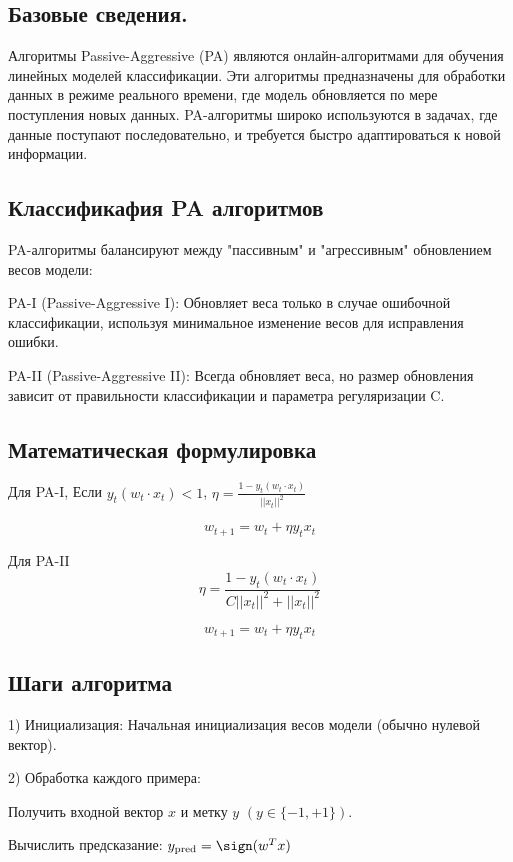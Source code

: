 \begin{itemize}
\subsection*{Базовые сведения.}

Алгоритмы Passive-Aggressive (PA) являются онлайн-алгоритмами для обучения линейных моделей классификации.
Эти алгоритмы предназначены для обработки данных в режиме реального времени, где модель обновляется по мере поступления новых данных. PA-алгоритмы широко используются в задачах, где данные поступают последовательно, и требуется быстро адаптироваться к новой информации.

\subsection*{Классификафия PA алгоритмов}

PA-алгоритмы балансируют между "пассивным" и "агрессивным" обновлением весов модели:

PA-I (Passive-Aggressive I): Обновляет веса только в случае ошибочной классификации, используя минимальное изменение весов для исправления ошибки.

PA-II (Passive-Aggressive II): Всегда обновляет веса, но размер обновления зависит от правильности классификации и параметра регуляризации C.

\subsection*{Математическая формулировка}

Для PA-I, Если $y_t(w_t \cdot x_t) < 1$, $\eta = \frac{1 - y_t(w_t \cdot x_t)}{||x_t||^2}$

\[
    w_{t+1} = w_t + \eta y_t x_t
\]


Для PA-II
\[
\eta = \frac{1 - y_t(w_t \cdot x_t)}{C||x_t||^2 + ||x_t||^2}
\]

\[
    w_{t+1} = w_t + \eta y_t x_t
\]


\subsection*{Шаги алгоритма}

1) Инициализация: Начальная инициализация весов модели (обычно нулевой вектор).

2) Обработка каждого примера:

Получить входной вектор $x$ и метку $y$ $(y \in \{−1,+1\})$.

Вычислить предсказание: $y_{\text{pred}} = \sign (w^T x)$


\end{itemize}
